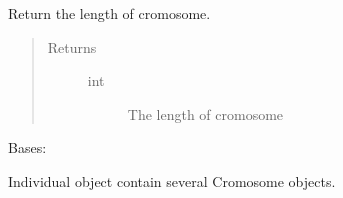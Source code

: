 \documentclass[letterpaper,10pt,english]{sphinxmanual}
\begin{document}
\begin{fulllineitems}
\begin{fulllineitems}
\begin{quote}
\begin{description}
\end{description}\end{quote}

\end{fulllineitems}


\begin{fulllineitems}
\label{\detokenize{pygace:pygace.ga.Cromosome.size}}
\sphinxAtStartPar
Return the length of cromosome.
\begin{quote}\begin{description}
\item[{Returns}] \leavevmode\begin{description}
\item[{int}] \leavevmode
\sphinxAtStartPar
The length of cromosome

\end{description}

\end{description}\end{quote}

\end{fulllineitems}


\begin{fulllineitems}
\label{\detokenize{pygace:pygace.ga.Cromosome.valid_type}}
\end{fulllineitems}


\end{fulllineitems}


\begin{fulllineitems}
\label{\detokenize{pygace:pygace.ga.Individual}}
\sphinxAtStartPar
Bases: 

\sphinxAtStartPar
Individual object contain several Cromosome objects.

\end{fulllineitems}
\end{document}
